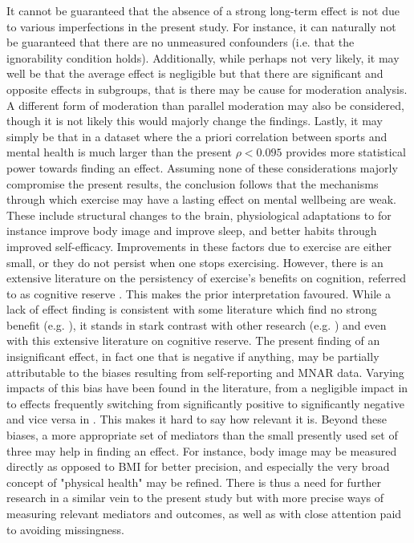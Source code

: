 It cannot be guaranteed that the absence of a strong long-term effect is not due to various imperfections
in the present study. For instance, it can naturally not be guaranteed that there are no unmeasured confounders
(i.e. that the ignorability condition holds). Additionally, while perhaps not very likely, it may well be that
the average effect is negligible but that there are significant and opposite effects in subgroups, that is there
may be cause for moderation analysis. A different form of moderation than parallel moderation may also be considered,
though it is not likely this would majorly change the findings.
Lastly, it may simply be that in a dataset where the a priori correlation
between sports and mental health is much larger than the present $\rho < 0.095$ provides more statistical power
towards finding an effect.
Assuming none of these considerations majorly compromise the present results, the conclusion follows that
the mechanisms through which exercise may have a lasting effect on mental wellbeing are weak.
These include structural changes to the brain, physiological adaptations to for instance
improve body image and improve sleep, and better habits through improved self-efficacy.
Improvements in these factors due to exercise are either small, or they do not persist when one stops exercising.
However, there is an extensive literature on the persistency of exercise's benefits on cognition, referred to as
cognitive reserve \cite{cheng2016cognitive,stern2009cognitive}. This makes the prior interpretation favoured.
While a lack of effect finding is consistent with some literature which find no strong benefit (e.g. ),
it stands in stark contrast with other research (e.g. ) and even with this extensive literature
on cognitive reserve.
The present finding of an insignificant effect, in fact one that is negative if anything, may be partially attributable
to the biases resulting from self-reporting and MNAR data.
Varying impacts of this bias have been found in the literature, from a negligible impact in 
to effects frequently switching from significantly positive to significantly negative and vice versa in .
This makes it hard to say how relevant it is.
Beyond these biases, a more appropriate set of mediators than the small presently used set of three may help
in finding an effect. For instance, body image may be measured directly as opposed to BMI for better precision,
and especially the very broad concept of "physical health" may be refined.
There is thus a need for further research in a similar vein to the present study but with more precise ways of measuring
relevant mediators and outcomes, as well as with close attention paid to avoiding missingness.

